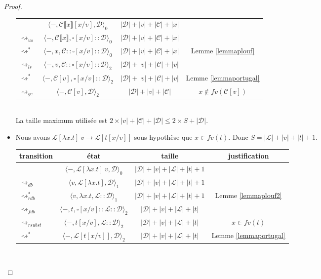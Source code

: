\documentclass[11pt,a4paper]{article}
\theoremstyle{definition}
\newcommand{\etatz}[1]{\langle #1 \rangle_0}
\newcommand{\etatu}[1]{\langle #1 \rangle_1}
\newcommand{\etatd}[1]{\langle #1 \rangle_2}
\newcommand{\mtd}{\mathcal{D}}
\newcommand{\mtc}{\mathcal{C}}
\newcommand{\mtl}{\mathcal{L}}
\begin{document}
\begin{proof}
\begin{itemize}
\begin{tabular}{@{}l c c c@{}}
                   & $\etatz{-,\mtc\llbracket x\rrbracket[x/v],\mtd}$ & $|\mtd|+|v|+|\mtc|+|x|$\\
        $\rightsquigarrow_{us}$ & $ \etatz{-, \mtc\llbracket x \rrbracket, \square[x/v]::\mtd}$ & $|\mtd| + |v| + |\mtc|+|x|$\\ 
        $\rightsquigarrow^*$ & $ \etatz{-, x ,\mtc:: \square[x/v]::\mtd}$ & $|\mtd| + |v| + |\mtc|+|x|$& Lemme \ref{lemmaplouf}\\
        $\rightsquigarrow_{ls}$ & $ \etatd{-, v ,\mtc:: \square[x/v]::\mtd}$ & $|\mtd| + |v| + |\mtc|+|v|$\\
        $\rightsquigarrow^*$ & $ \etatd{-, \mtc[v], \square[x/v]::\mtd}$ & $|\mtd| + |v| + |\mtc| +|v|$ &Lemme \ref{lemmaportugal}\\ 
        $\rightsquigarrow_{gc}$ & $ \etatd{-, \mtc[v], \mtd}$ & $|\mtd| + |v| + |\mtc|$& $x\notin fv(\mtc[v])$\\ 
        \bottomrule
      \end{tabular}\\
      La taille maximum utilisée est $2 \times |v| + |\mtc| +|\mtd| \le 2\times S +|\mtd|$.
    \item {} Nous avons $\mtl[\lambda x.t]~v \rightarrow \mtl[t[x/v]]$ sous hypothèse que $x\in fv(t)$. Donc $S = |\mtl|+|v|+|t|+1$.\\
      \begin{tabular}{@{}l c c c@{}}
        \toprule
        transition & état & taille & justification\\
        \midrule
                   & $\etatz{-,\mtl[\lambda x.t]~v,\mtd}$ & $|\mtd|+|v|+|\mtl|+|t|+1$\\
        $\rightsquigarrow_{db}$ & $ \etatu{v, \mtl[ \lambda x.t], \mtd}$ & $|\mtd| + |v| + |\mtl|+|t|+1$\\ 
        $\rightsquigarrow^*_{rdb}$ & $ \etatu{v, \lambda x.t ,\mtl::\mtd}$ & $|\mtd| + |v| + |\mtl|+|t|+1$& Lemme \ref{lemmaplouf2}\\
        $\rightsquigarrow_{fdb}$ & $ \etatd{-, t ,\square[x/v]::\mtl::\mtd}$ & $|\mtd| + |v| + |\mtl|+|t|$\\
        $\rightsquigarrow_{rsubst}$ & $ \etatd{-, t[x/v] ,\mtl::\mtd}$ & $|\mtd| +|v|+ |\mtl|+|t|$& $x\in fv(t)$\\
        $\rightsquigarrow^*$ & $ \etatd{-, \mtl[t[x/v]],\mtd}$ & $|\mtd| + |v| + |\mtl|+|t|$ &Lemme \ref{lemmaportugal}\\ 
        \bottomrule
      \end{tabular}\\

\end{itemize}
\end{proof}
\end{document}
